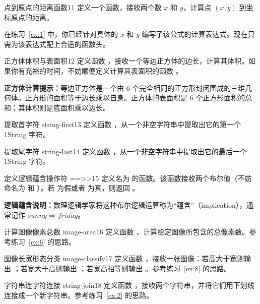 \begin{exercise}{点到原点的距离函数}{11}
定义一个函数，接收两个数 $x$ 和 $y$，计算点 $(x,y)$ 到坐标原点的距离。

在练习~\ref{ex:1} 中，你已经针对具体的 $x$ 和 $y$ 编写了该公式的计算表达式。现在只需为该表达式配上合适的函数头。
\end{exercise}

\begin{exercise}{正方体体积与表面积}{12}
定义函数 ，接收一个等边正方体的边长，计算其体积。如果你有充裕的时间，不妨顺便定义计算其表面积的函数 。

\textbf{正方体计算提示：}等边正方体是一个由 6 个完全相同的正方形封闭围成的三维几何体。正方形的面积等于边长乘以自身。正方体的表面积是 6 个正方形面积的总和；其体积则是底面积乘以边长。
\end{exercise}

\begin{exercise}{提取首字符 string-first}{13}
定义函数 ，从一个非空字符串中提取出它的第一个 1String 字符。
\end{exercise}

\begin{exercise}{提取尾字符 string-last}{14}
定义函数 ，从一个非空字符串中提取出它的最后一个 1String 字符。
\end{exercise}

\begin{exercise}{定义逻辑蕴含操作符 ==>>}{15}
定义名为 \code{==>} 的函数。该函数接收两个布尔值（不妨命名为  和 ）。若  为假或者  为真，则返回 。

\textbf{逻辑蕴含说明：}数理逻辑学家将这种布尔逻辑运算称为“蕴含”（implication），通常记作 $sunny \Rightarrow friday$。
\end{exercise}

\begin{exercise}{计算图像像素总数 image-area}{16}
定义函数 ，计算给定图像所包含的总像素数。参考练习~\ref{ex:6} 的思路。
\end{exercise}

\begin{exercise}{图像长宽形态分类 image-classify}{17}
定义函数 ，接收一张图像：若高大于宽则输出 ；若宽大于高则输出 ；若宽高相等则输出 。参考练习~\ref{ex:8} 的思路。
\end{exercise}

\begin{exercise}{字符串连字符连接 string-join}{18}
定义函数 ，接收两个字符串，并将它们用下划线  连接成一个新字符串。参考练习~\ref{ex:2} 的思路。
\end{exercise}

